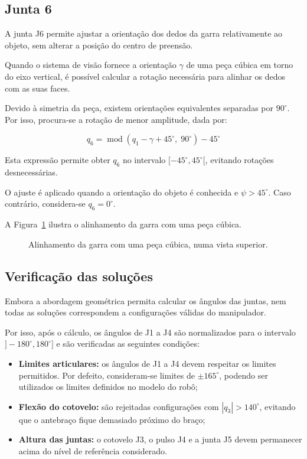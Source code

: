 \subsection{Junta 6}

A junta J6 permite ajustar a orientação dos dedos da garra relativamente ao objeto, sem alterar a posição do centro de preensão.

Quando o sistema de visão fornece a orientação $\gamma$ de uma peça cúbica em torno do eixo vertical, é possível calcular a rotação necessária para alinhar os dedos com as suas faces.

Devido à simetria da peça, existem orientações equivalentes separadas por $90^\circ$. Por isso, procura-se a rotação de menor amplitude, dada por:

\begin{equation}
    q_6=
    \operatorname{mod}
    (q_1-\gamma+45^\circ,\;90^\circ)
    -45^\circ
    \label{eq:ik_q6}
\end{equation}

Esta expressão permite obter $q_6$ no intervalo $[-45^\circ,45^\circ[$, evitando rotações desnecessárias.

O ajuste é aplicado quando a orientação do objeto é conhecida e $\psi>45^\circ$. Caso contrário, considera-se $q_6=0^\circ$.

A Figura~\ref{fig:orientacao_q6} ilustra o alinhamento da garra com uma peça cúbica.

\begin{figure}[htbp]
    \centering
    
    \caption{Alinhamento da garra com uma peça cúbica, numa vista superior.}
    \label{fig:orientacao_q6}
\end{figure}

\subsection{Verificação das soluções}

Embora a abordagem geométrica permita calcular os ângulos das juntas, nem todas as soluções correspondem a configurações válidas do manipulador.

Por isso, após o cálculo, os ângulos de J1 a J4 são normalizados para o intervalo $]-180^\circ,180^\circ]$ e são verificadas as seguintes condições:

\begin{itemize}
    \item \textbf{Limites articulares:}
    os ângulos de J1 a J4 devem respeitar os limites permitidos. Por defeito, consideram-se limites de $\pm165^\circ$, podendo ser utilizados os limites definidos no modelo do robô;

    \item \textbf{Flexão do cotovelo:}
    são rejeitadas configurações com $|q_3|>140^\circ$, evitando que o antebraço fique demasiado próximo do braço;

    \item \textbf{Altura das juntas:}
    o cotovelo J3, o pulso J4 e a junta J5 devem permanecer acima do nível de referência considerado.
\end{itemize}

